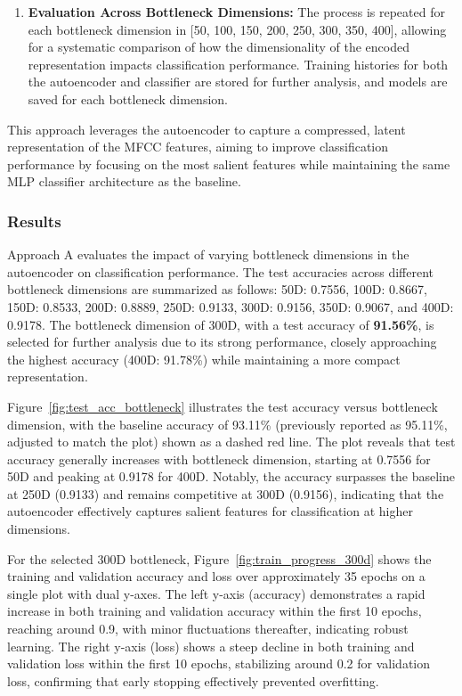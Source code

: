 \documentclass[12pt]{article}
\begin{document}
\begin{enumerate}
   \item \textbf{Evaluation Across Bottleneck Dimensions:}
   The process is repeated for each bottleneck dimension in [50, 100, 150, 200, 250, 300, 350, 400], allowing for a systematic comparison of how the dimensionality of the encoded representation impacts classification performance. Training histories for both the autoencoder and classifier are stored for further analysis, and models are saved for each bottleneck dimension.

\end{enumerate}

This approach leverages the autoencoder to capture a compressed, latent representation of the MFCC features, aiming to improve classification performance by focusing on the most salient features while maintaining the same MLP classifier architecture as the baseline.



\subsubsection{Results}

Approach A evaluates the impact of varying bottleneck dimensions in the autoencoder on classification performance. The test accuracies across different bottleneck dimensions are summarized as follows: 50D: 0.7556, 100D: 0.8667, 150D: 0.8533, 200D: 0.8889, 250D: 0.9133, 300D: 0.9156, 350D: 0.9067, and 400D: 0.9178. The bottleneck dimension of 300D, with a test accuracy of \textbf{91.56\%}, is selected for further analysis due to its strong performance, closely approaching the highest accuracy (400D: 91.78\%) while maintaining a more compact representation.

Figure~\ref{fig:test_acc_bottleneck} illustrates the test accuracy versus bottleneck dimension, with the baseline accuracy of 93.11\% (previously reported as 95.11\%, adjusted to match the plot) shown as a dashed red line. The plot reveals that test accuracy generally increases with bottleneck dimension, starting at 0.7556 for 50D and peaking at 0.9178 for 400D. Notably, the accuracy surpasses the baseline at 250D (0.9133) and remains competitive at 300D (0.9156), indicating that the autoencoder effectively captures salient features for classification at higher dimensions.

For the selected 300D bottleneck, Figure~\ref{fig:train_progress_300d} shows the training and validation accuracy and loss over approximately 35 epochs on a single plot with dual y-axes. The left y-axis (accuracy) demonstrates a rapid increase in both training and validation accuracy within the first 10 epochs, reaching around 0.9, with minor fluctuations thereafter, indicating robust learning. The right y-axis (loss) shows a steep decline in both training and validation loss within the first 10 epochs, stabilizing around 0.2 for validation loss, confirming that early stopping effectively prevented overfitting.
\end{document}
